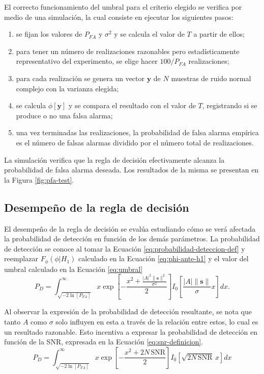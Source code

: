 El correcto funcionamiento del umbral para el criterio elegido se verifica por medio de una simulación, la cual consiste en ejecutar los siguientes pasos:
\begin{enumerate}
    \item se fijan los valores de $P_{FA}$ y $\sigma^2$ y se calcula el valor de $T$ a partir de ellos;
    \item para tener un número de realizaciones razonables pero estadísticamente representativo del experimento, se elige hacer $100/P_{FA}$ realizaciones;
    \item para cada realización se genera un vector $\mathbf{y}$ de $N$ muestras de ruido normal complejo con la varianza elegida; 
    \item se calcula $\phi[\mathbf{y}]$ y se compara el resultado con el valor de $T$, registrando si se produce o no una falsa alarma;
    \item una vez terminadas las realizaciones, la probabilidad de falsa alarma empírica es el número de falsas alarmas dividido por el número total de realizaciones.
\end{enumerate}
La simulación verifica que la regla de decisión efectivamente alcanza la probabilidad de falsa alarma deseada. Los resultados de la misma se presentan en la Figura \ref{fig:pfa-test}.

\subsection{Desempeño de la regla de decisión}
\label{Ss:hipotesis-desempeño}
El desempeño de la regla de decisión se evalúa estudiando cómo se verá afectada la probabilidad de detección en función de los demás parámetros. La probabilidad de detección se conoce al tomar la Ecuación \ref{eq:probabilidad-deteccion-def} y reemplazar $F_\phi(\phi|H_1)$ calculado en la Ecuación \ref{eq:phi-ante-h1} y el valor del umbral calculado en la Ecuación \ref{eq:umbral}
\begin{equation}\label{eq:probabilidad-deteccion}
    P_D = \int_{\sqrt{-2 \ln\left[P_{FA}\right]}}^\infty x\exp\left[-\frac{x^2 + \frac{|A|^2\lVert\mathbf{s}\rVert^2}{\sigma^2}}{2}\right]I_0\left[\frac{|A|\lVert\mathbf{s}\rVert}{\sigma} x\right] dx.
\end{equation}

Al observar la expresión de la probabilidad de detección resultante, se nota que tanto $A$ como $\sigma$ solo influyen en esta a través de la relación entre estos, lo cual es un resultado razonable. Esto incentiva a expresar la probabilidad de detección en función de la SNR, expresada en la Ecuación \ref{eq:snr-definicion}.
\begin{equation}\label{eq:probabilidad-deteccion-snr}
    P_D = \int_{\sqrt{-2 \ln\left[P_{FA}\right]}}^\infty x\exp\left[-\frac{x^2 + 2N\,\text{SNR}}{2}\right]I_0\left[\sqrt{2N\,\text{SNR}}\,x\right] dx
\end{equation}

